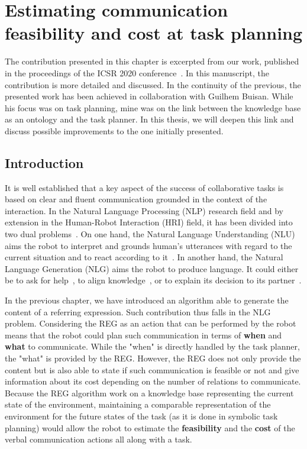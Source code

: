\ifdefined{}
\else
\setcounter{chapter}{5} %
\dominitoc
\faketableofcontents
\fi

\chapter{Estimating communication feasibility and cost at task planning}
\minitoc

The contribution presented in this chapter is excerpted from our work, published in the proceedings of the ICSR 2020 conference~\cite{buisan_2020_human}. In this manuscript, the contribution is more detailed and discussed. In the continuity of the previous, the presented work has been achieved in collaboration with Guilhem Buisan. While his focus was on task planning, mine was on the link between the knowledge base as an ontology and the task planner. In this thesis, we will deepen this link and discuss possible improvements to the one initially presented.

\section{Introduction}

It is well established that a key aspect of the success of collaborative tasks is based on clear and fluent communication grounded in the context of the interaction. In the Natural Language Processing (NLP) research field and by extension in the Human-Robot Interaction (HRI) field, it has been divided into two dual problems~\cite{tellex_2020_robots}. On one hand, the Natural Language Understanding (NLU) aims the robot to interpret and grounds human's utterances with regard to the current situation and to react according to it~\cite{brawer_2018_situated}. In another hand, the Natural Language Generation (NLG) aims the robot to produce language. It could either be to ask for help~\cite{tellex_2014_asking}, to align knowledge~\cite{devin_2016_implemented}, or to explain its decision to its partner~\cite{roncone_2017_transparent}.

In the previous chapter, we have introduced an algorithm able to generate the content of a referring expression. Such contribution thus falls in the NLG problem. Considering the REG as an action that can be performed by the robot means that the robot could plan such communication in terms of \textbf{when} and \textbf{what} to communicate. While the "when" is directly handled by the task planner, the "what" is provided by the REG. However, the REG does not only provide the content but is also able to state if such communication is feasible or not and give information about its cost depending on the number of relations to communicate. Because the REG algorithm work on a knowledge base representing the current state of the environment, maintaining a comparable representation of the environment for the future states of the task (as it is done in symbolic task planning) would allow the robot to estimate the \textbf{feasibility} and the \textbf{cost} of the verbal communication actions all along with a task.

